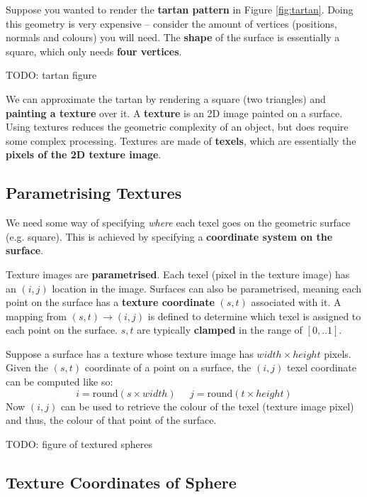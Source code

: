 \documentclass{article}
\begin{document}
Suppose you wanted to render the \textbf{tartan pattern} in Figure \ref{fig:tartan}. Doing this geometry is very expensive -- consider the amount of vertices (positions, normals and colours) you will need. The \textbf{shape} of the surface is essentially a square, which only needs \textbf{four vertices}.

TODO: tartan figure

We can approximate the tartan by rendering a square (two triangles) and \textbf{painting a texture} over it. A \textbf{texture} is an 2D image painted on a surface. Using textures reduces the geometric complexity of an object, but does require some complex processing. Textures are made of \textbf{texels}, which are essentially the \textbf{pixels of the 2D texture image}.

\subsection{Parametrising Textures}

We need some way of specifying \textit{where} each texel goes on the geometric surface (e.g. square). This is achieved by specifying a \textbf{coordinate system on the surface}.

Texture images are \textbf{parametrised}. Each texel (pixel in the texture image) has an $(i,j)$ location in the image. Surfaces can also be parametrised, meaning each point on the surface has a \textbf{texture coordinate} $(s, t)$ associated with it. A mapping from $(s, t) \rightarrow (i, j)$ is defined to determine which texel is assigned to each point on the surface. $s,t$ are typically \textbf{clamped} in the range of $[0,..1]$.

Suppose a surface has a texture whose texture image has $width \times height$ pixels. Given the $(s, t)$ coordinate of a point on a surface, the $(i, j)$ texel coordinate can be computed like so:
\begin{equation}
	i = \text{round}(s \times width) \;\;\;\;\;
	j = \text{round}(t \times height)
	\label{eq:texture-coord}
\end{equation}
Now $(i, j)$ can be used to retrieve the colour of the texel (texture image pixel) and thus, the colour of that point of the surface.

TODO: figure of textured spheres

\subsection{Texture Coordinates of Sphere}
\end{document}

